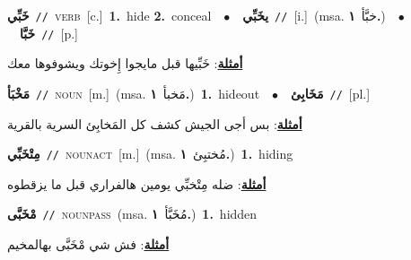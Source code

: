 \documentclass[10pt,a4paper,twoside]{article} %
\begin{document}
\begin{multicols}{2}
{\setlength\topsep{0pt}\textbf{\foreignlanguage{arabic}{خَبِّي}}\ {\color{gray}\texttt{//}\color{black}}\ \textsc{verb}\ [c.]\ \textbf{1.}~hide  \textbf{2.}~conceal\ \ $\bullet$\ \ \setlength\topsep{0pt}\textbf{\foreignlanguage{arabic}{يخَبِّي}}\ {\color{gray}\texttt{//}\color{black}}\ [i.]\ \color{gray}(msa. \foreignlanguage{arabic}{خبَّأ}~\foreignlanguage{arabic}{\textbf{١.}})\color{black}\ \ $\bullet$\ \ \setlength\topsep{0pt}\textbf{\foreignlanguage{arabic}{خَبَّا}}\ {\color{gray}\texttt{//}\color{black}}\ [p.]\  \begin{flushright}\color{gray}\foreignlanguage{arabic}{\textbf{\underline{\foreignlanguage{arabic}{أمثلة}}}: خَبِّيها قبل مايجوا إِخوتك ويشوفوها معك}\end{flushright}\color{black}} \vspace{2mm}

{\setlength\topsep{0pt}\textbf{\foreignlanguage{arabic}{مَخْبَأ}}\ {\color{gray}\texttt{//}\color{black}}\ \textsc{noun}\ [m.]\ \color{gray}(msa. \foreignlanguage{arabic}{مَخبأ}~\foreignlanguage{arabic}{\textbf{١.}})\color{black}\ \textbf{1.}~hideout\ \ $\bullet$\ \ \setlength\topsep{0pt}\textbf{\foreignlanguage{arabic}{مَخَابِئ}}\ {\color{gray}\texttt{//}\color{black}}\ [pl.]\  \begin{flushright}\color{gray}\foreignlanguage{arabic}{\textbf{\underline{\foreignlanguage{arabic}{أمثلة}}}: بس أجى الجيش كشف كل المَخابِئ السرية بالقرية}\end{flushright}\color{black}} \vspace{2mm}

{\setlength\topsep{0pt}\textbf{\foreignlanguage{arabic}{مِتْخَبِّي}}\ {\color{gray}\texttt{//}\color{black}}\ \textsc{noun\textunderscore act}\ [m.]\ \color{gray}(msa. \foreignlanguage{arabic}{مُختبِئ}~\foreignlanguage{arabic}{\textbf{١.}})\color{black}\ \textbf{1.}~hiding\  \begin{flushright}\color{gray}\foreignlanguage{arabic}{\textbf{\underline{\foreignlanguage{arabic}{أمثلة}}}: ضله مِتْخبِّي يومين هالفراري قبل ما يزقطوه}\end{flushright}\color{black}} \vspace{2mm}

{\setlength\topsep{0pt}\textbf{\foreignlanguage{arabic}{مْخَبَّى}}\ {\color{gray}\texttt{//}\color{black}}\ \textsc{noun\textunderscore pass}\ \color{gray}(msa. \foreignlanguage{arabic}{مُخَبَّأ}~\foreignlanguage{arabic}{\textbf{١.}})\color{black}\ \textbf{1.}~hidden\  \begin{flushright}\color{gray}\foreignlanguage{arabic}{\textbf{\underline{\foreignlanguage{arabic}{أمثلة}}}: فش شي مْخَبَّى بهالمخيم}\end{flushright}\color{black}} \vspace{2mm}


\end{multicols}
\end{document}
